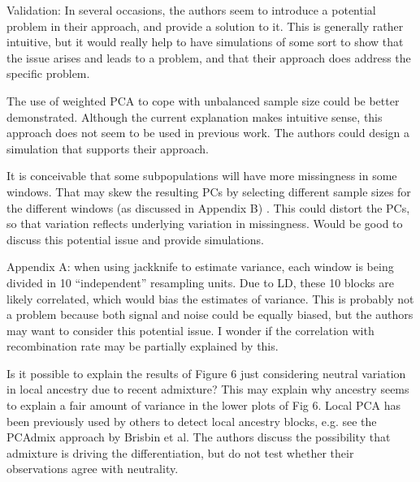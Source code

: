 \begin{point}{Validation:}
In several occasions, the authors seem to introduce a potential problem in their
approach, and provide a solution to it. This is generally rather intuitive, but it would really help
to have simulations of some sort to show that the issue arises and leads to a problem, and that
their approach does address the specific problem.
\end{point}



\begin{point}{}
The use of weighted PCA to cope with unbalanced sample size could be better demonstrated.
Although the current explanation makes intuitive sense, this approach does not seem to be
used in previous work. The authors could design a simulation that supports their approach.
\end{point}

\begin{point}{}
It is conceivable that some subpopulations will have more missingness in some windows. That
may skew the resulting PCs by selecting different sample sizes for the different windows (as
discussed in Appendix B) . This could distort the PCs, so that variation reflects underlying
variation in missingness. Would be good to discuss this potential issue and provide simulations.
\end{point}

\begin{point}{Appendix A:}
when using jackknife to estimate variance, each window is being divided in 10
``independent'' resampling units. Due to LD, these 10 blocks are likely correlated, which would
bias the estimates of variance. This is probably not a problem because both signal and noise
could be equally biased, but the authors may want to consider this potential issue. I wonder if
the correlation with recombination rate may be partially explained by this.
\end{point}

\begin{point}{}
Is it possible to explain the results of Figure 6 just considering neutral variation in local
ancestry due to recent admixture? This may explain why ancestry seems to explain a fair
amount of variance in the lower plots of Fig 6. Local PCA has been previously used by others to
detect local ancestry blocks, e.g. see the PCAdmix approach by Brisbin et al. The authors
discuss the possibility that admixture is driving the differentiation, but do not test whether their
observations agree with neutrality.
\end{point}

